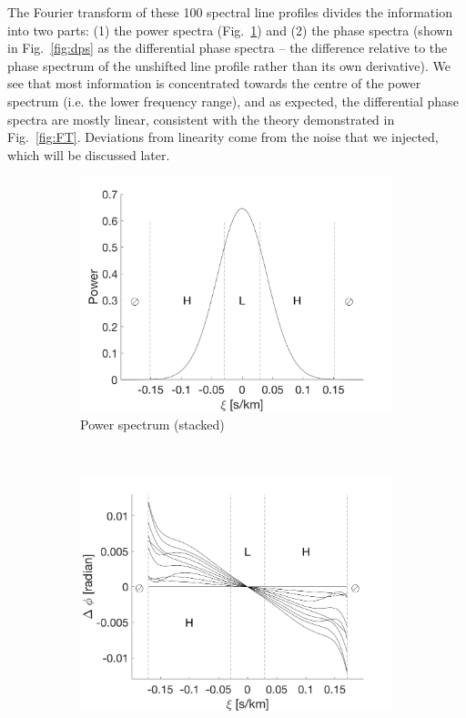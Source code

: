 The Fourier transform of these 100 spectral line profiles divides the information into two parts: (1) the power spectra (Fig.~\ref{fig:power_spectrum}) and (2) the phase spectra (shown in Fig.~\ref{fig:dps} as the differential phase spectra -- the difference relative to the phase spectrum of the unshifted line profile rather than its own derivative). We see that most information is concentrated towards the centre of the power spectrum (i.e. the lower frequency range), and as expected, the differential phase spectra are mostly linear, consistent with the theory demonstrated in Fig.~\ref{fig:FT}. Deviations from linearity come from the noise that we injected, which will be discussed later. 

\begin{figure}[tbp]	
    \begin{subfigure}[b]{0.49\textwidth}
        \includegraphics[width=\textwidth]{./Figures/Methods/2-FT_power.png}
        \caption{Power spectrum (stacked)}
        \label{fig:power_spectrum}
    \end{subfigure}
	~
    \begin{subfigure}[b]{0.49\textwidth}
        \includegraphics[width=\textwidth]{./Figures/Methods/4-Relative_phase_angle.png}

\end{subfigure}
\end{figure}
